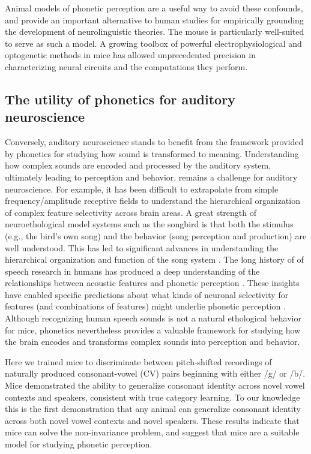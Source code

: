 \documentclass[11pt]{article}\usepackage[]{graphicx}\usepackage[]{color}
\begin{document}
Animal models of phonetic perception are a useful way to avoid these confounds, and provide an important alternative to human studies for empirically grounding the development of neurolinguistic theories. The mouse is particularly well-suited to serve as such a model. A growing toolbox of powerful electrophysiological and optogenetic methods in mice has allowed unprecedented precision in characterizing neural circuits and the computations they perform.

\subsection{The utility of phonetics for auditory neuroscience}

Conversely, auditory neuroscience stands to benefit from the framework provided by phonetics for studying how sound is transformed to meaning. Understanding how complex sounds are encoded and processed by the auditory system, ultimately leading to perception and behavior, remains a challenge for auditory neuroscience. For example, it has been difficult to extrapolate from simple frequency/amplitude receptive fields to understand the hierarchical organization of complex feature selectivity across brain areas. A great strength of neuroethological model systems such as the songbird is that both the stimulus (e.g., the bird's own song) and the behavior (song perception and production) are well understood. This has led to significant advances in understanding the hierarchical organization and function of the song system \cite{Brenowitz1997,Theunissen2014}. The long history of of speech research in humans has produced a deep understanding of the relationships between acoustic features and phonetic perception \cite{Peterson1952}. These insights have enabled specific predictions about what kinds of neuronal selectivity for features (and combinations of features) might underlie phonetic perception \cite{Sussman1998}. Although recognizing human speech sounds is not a natural ethological behavior for mice, phonetics nevertheless provides a valuable framework for studying how the brain encodes and transforms complex sounds into perception and behavior.

Here we trained mice to discriminate between pitch-shifted recordings of naturally produced consonant-vowel (CV) pairs beginning with either /g/ or /b/. Mice demonstrated the ability to generalize consonant identity across novel vowel contexts and speakers, consistent with true category learning. To our knowledge this is the first demonstration that any animal can generalize consonant identity across both novel vowel contexts and novel speakers. These results indicate that mice can solve the non-invariance problem, and suggest that mice are a suitable model for studying phonetic perception.
\end{document}

